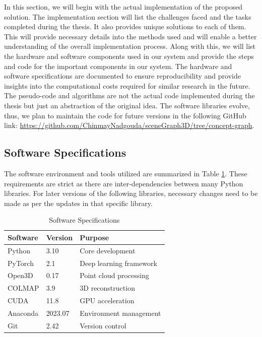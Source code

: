 In this section, we will begin with the actual implementation of the proposed solution. The implementation section will list the challenges faced and
the tasks completed during the thesis. It also provides unique solutions to each of them. This will provide necessary details into the methods used and will
enable a better understanding of the overall implementation process. Along with this, we will list the hardware and software components 
used in our system and provide the steps and code for the important components in our system. 
The hardware and software specifications are documented to ensure reproducibility and provide
insights into the computational costs required for similar research in the future. The pseudo-code and algorithms are not the actual code implemented
during the thesis but just an abstraction of the original idea. The software libraries evolve, thus, we plan to maintain the code for
future versions in the following GitHub link: \url{https://github.com/ChinmayNadgouda/sceneGraph3D/tree/concept-graph}.

\subsection{Software Specifications}
The software environment and tools utilized are summarized in Table \ref{tab:software_specs}. These requirements are strict as there are inter-dependencies
between many Python libraries. For later versions of the following libraries, necessary changes need to be made as per the updates in that specific library.

\begin{table}[ht]
    \centering
    \caption{Software Specifications}
    \label{tab:software_specs}
    \begin{tabular}{lll}
        \toprule
        \textbf{Software}      & \textbf{Version}   & \textbf{Purpose}                     \\
        \midrule
        Python                & 3.10               & Core development                      \\
        PyTorch               & 2.1                & Deep learning framework               \\
        Open3D                & 0.17               & Point cloud processing                \\
        COLMAP                & 3.9                & 3D reconstruction                     \\
        CUDA                  & 11.8               & GPU acceleration                      \\
        Anaconda              & 2023.07            & Environment management                \\
        Git                   & 2.42               & Version control                       \\
        \bottomrule
    \end{tabular}
\end{table}
